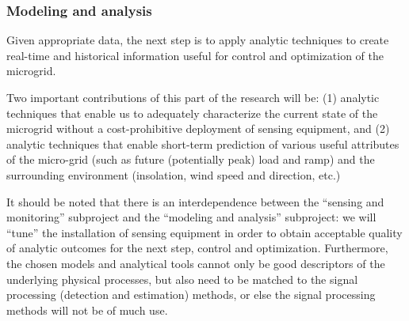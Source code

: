 
\subsubsection{Modeling and analysis}

Given appropriate data, the next step is to apply analytic techniques to
create real-time and historical information useful for control and
optimization of the microgrid.

Two important contributions of this part of the research will be: (1)
analytic techniques that enable us to adequately characterize the current
state of the microgrid without a cost-prohibitive deployment of sensing
equipment, and (2) analytic techniques that enable short-term prediction of
various useful attributes of the micro-grid (such as future (potentially
peak) load and ramp) and the surrounding environment (insolation, wind
speed and direction, etc.)

It should be noted that there is an interdependence between the ``sensing
and monitoring'' subproject and the ``modeling and analysis'' subproject:
we will ``tune'' the installation of sensing equipment in order to obtain
acceptable quality of analytic outcomes for the next step, control and
optimization. Furthermore, the chosen models and analytical tools cannot
only be good descriptors of the underlying physical processes, but also
need to be matched to the signal processing (detection and estimation)
methods, or else the signal processing methods will not be of much use.


